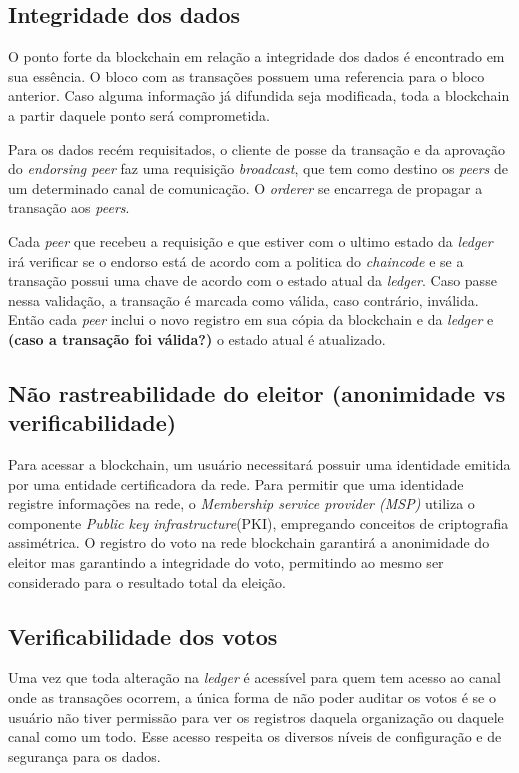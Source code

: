     \subsection{Integridade dos dados} %
        O ponto forte da blockchain em relação a integridade dos dados é encontrado em sua essência. O bloco com as transações possuem uma referencia para o bloco anterior. Caso alguma informação já difundida seja modificada, toda a blockchain a partir daquele ponto será comprometida. 
    
        Para os dados recém requisitados, o cliente de posse da transação e da aprovação do \textit{endorsing peer} faz uma requisição \textit{broadcast}, que tem como destino os \textit{peers} de um determinado canal de comunicação. O \textit{orderer} se encarrega de propagar a transação aos \textit{peers}. 
    
        Cada \textit{peer} que recebeu a requisição e que estiver com o ultimo estado da \textit{ledger} irá verificar se o endorso está de acordo com a politica do \textit{chaincode} e se a transação possui uma chave de acordo com o estado atual da \textit{ledger}. Caso passe nessa validação, a transação é marcada como válida, caso contrário, inválida. Então cada \textit{peer} inclui o novo registro em sua cópia da blockchain e da \textit{ledger} e \textbf{(caso a transação foi válida?)} o estado atual é atualizado.
    
    \subsection{Não rastreabilidade do eleitor (anonimidade vs verificabilidade)} %
        Para acessar a blockchain, um usuário necessitará possuir uma identidade emitida por uma entidade certificadora da rede. Para permitir que uma identidade registre informações na rede, o \textit{Membership service provider (MSP)} utiliza o componente \textit{Public key infrastructure}(PKI), empregando conceitos de criptografia assimétrica. O registro do voto na rede blockchain garantirá a anonimidade do eleitor mas garantindo a integridade do voto, permitindo ao mesmo ser considerado para o resultado total da eleição. 
    
    \subsection{Verificabilidade dos votos}
        Uma vez que toda alteração na \textit{ledger} é acessível para quem tem acesso ao canal onde as transações ocorrem, a única forma de não poder auditar os votos é se o usuário não tiver permissão para ver os registros daquela organização ou daquele canal como um todo. Esse acesso respeita os diversos níveis de configuração e de segurança para os dados.
    
